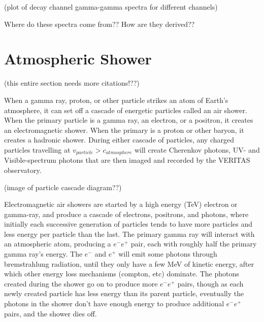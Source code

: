 (plot of decay channel gamma-gamma spectra for different channels)

{\color{red}Where do these spectra come from??}
{\color{red}How are they derived??}


\section{Atmospheric Shower}
{\color{red}(this entire section needs more citations!??)}

When a gamma ray, proton, or other particle strikes an atom of Earth's atmosphere, it can set off a cascade of energetic particles called an air shower.
When the primary particle is a gamma ray, an electron, or a positron, it creates an electromagnetic shower.
When the primary is a proton or other baryon, it creates a hadronic shower.
During either cascade of particles, any charged particles travelling at $v_{particle} > c_{atmosphere}$ will create Cherenkov photons, UV- and Visible-spectrum photons that are then imaged and recorded by the VERITAS observatory.

{\color{red}(image of particle cascade diagram??)}

Electromagnetic air showers are started by a high energy (\nicetilde TeV) electron or gamma-ray, and produce a cascade of electrons, positrons, and photons, where initially each successive generation of particles tends to have more particles and less energy per particle than the last.
The primary gamma ray will interact with an atmospheric atom, producing a $e^{-}e^{+}$ pair, each with roughly half the primary gamma ray's energy.
The $e^{-}$ and $e^{+}$ will emit some photons through bremstrahlung radiation, until they only have a few MeV of kinetic energy, after which other energy loss mechanisms (compton, etc) dominate.
The photons created during the shower go on to produce more $e^{-}e^{+}$ pairs, though as each newly created particle has less energy than its parent particle, eventually the photons in the shower don't have enough energy to produce additional $e^{-}e^{+}$ pairs, and the shower dies off.

